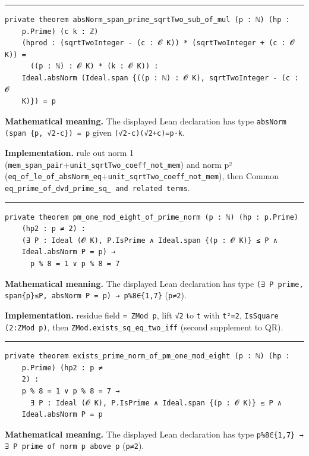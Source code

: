 \documentclass[UTF8,a4paper,11pt,fontset=fandol]{ctexart}
\theoremstyle{definition}
\newcommand{\statementsep}{\par\medskip\hrule\medskip}
\begin{document}
\statementsep
\begin{verbatim}
private theorem absNorm_span_prime_sqrtTwo_sub_of_mul (p : ℕ) (hp :
    p.Prime) (c k : ℤ)
    (hprod : (sqrtTwoInteger - (c : 𝓞 K)) * (sqrtTwoInteger + (c : 𝓞 K)) =
      ((p : ℕ) : 𝓞 K) * (k : 𝓞 K)) :
    Ideal.absNorm (Ideal.span {((p : ℕ) : 𝓞 K), sqrtTwoInteger - (c : 𝓞
    K)}) = p
\end{verbatim}
\noindent\textbf{Mathematical meaning.} The displayed Lean declaration has type \texttt{absNorm (span \{p, √2-c\}) = p} given \texttt{(√2-c)(√2+c)=p·k}.\par
\noindent\textbf{Implementation.} rule out norm 1 (\texttt{mem\_\allowbreak{}span\_\allowbreak{}pair}+\texttt{unit\_\allowbreak{}sqrtTwo\_\allowbreak{}coeff\_\allowbreak{}not\_\allowbreak{}mem}) and norm p² (\texttt{eq\_\allowbreak{}of\_\allowbreak{}le\_\allowbreak{}of\_\allowbreak{}absNorm\_\allowbreak{}eq}+\texttt{unit\_\allowbreak{}sqrtTwo\_\allowbreak{}coeff\_\allowbreak{}not\_\allowbreak{}mem}), then Common \texttt{eq\_\allowbreak{}prime\_\allowbreak{}of\_\allowbreak{}dvd\_\allowbreak{}prime\_\allowbreak{}sq\_\allowbreak{} and related terms}.\par
\statementsep
\begin{verbatim}
private theorem pm_one_mod_eight_of_prime_norm (p : ℕ) (hp : p.Prime)
    (hp2 : p ≠ 2) :
    (∃ P : Ideal (𝓞 K), P.IsPrime ∧ Ideal.span {(p : 𝓞 K)} ≤ P ∧
    Ideal.absNorm P = p) →
      p % 8 = 1 ∨ p % 8 = 7
\end{verbatim}
\noindent\textbf{Mathematical meaning.} The displayed Lean declaration has type \texttt{(∃ P prime, span\{p\}≤P, absNorm P = p) → p\%8∈\{1,7\}} (\texttt{p≠2}).\par
\noindent\textbf{Implementation.} residue field \texttt{≃ ZMod p}, lift \texttt{√2} to \texttt{t} with \texttt{t²=2}, \texttt{IsSquare (2:ZMod p)}, then \texttt{ZMod.\allowbreak{}exists\_\allowbreak{}sq\_\allowbreak{}eq\_\allowbreak{}two\_\allowbreak{}iff} (second supplement to QR).\par
\statementsep
\begin{verbatim}
private theorem exists_prime_norm_of_pm_one_mod_eight (p : ℕ) (hp :
    p.Prime) (hp2 : p ≠
    2) :
    p % 8 = 1 ∨ p % 8 = 7 →
      ∃ P : Ideal (𝓞 K), P.IsPrime ∧ Ideal.span {(p : 𝓞 K)} ≤ P ∧
    Ideal.absNorm P = p
\end{verbatim}
\noindent\textbf{Mathematical meaning.} The displayed Lean declaration has type \texttt{p\%8∈\{1,7\} → ∃ P prime of norm p above p} (\texttt{p≠2}).\par
\end{document}
